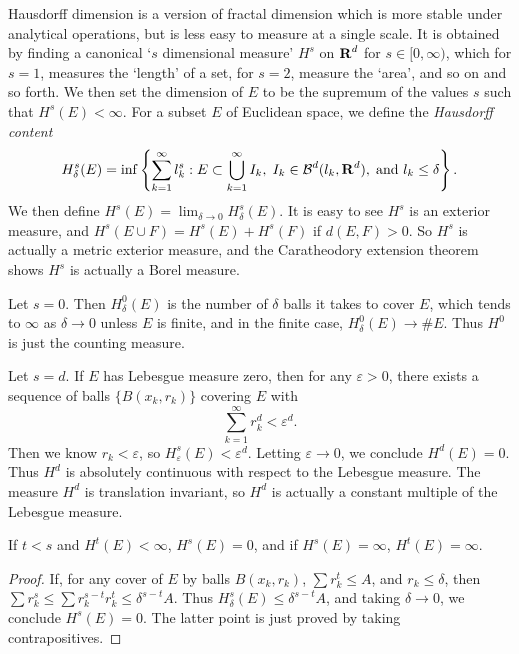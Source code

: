 Hausdorff dimension is a version of fractal dimension which is more stable under analytical operations, but is less easy to measure at a single scale. It is obtained by finding a canonical `$s$ dimensional measure' $H^s$ on $\operatorname{\mathbf{R}}^d$ for $s \in [0,\infty)$, which for $s = 1$, measures the `length' of a set, for $s = 2$, measure the `area', and so on and so forth. We then set the dimension of $E$ to be the supremum of the values $s$ such that $H^s(E) < \infty$. For a subset $E$ of Euclidean space, we define the {\it Hausdorff content}
%
\[ H_\delta^s(E) = \inf \left\{ \sum_{k = 1}^\infty l_k^s : E \subset \bigcup_{k = 1}^\infty I_k,\; I_k \in \operatorname{\mathcal{B}}^d(l_k,\operatorname{\mathbf{R}}^d),\; \text{and}\ l_k \leq \delta \right\}. \]
%
We then define $H^s(E) = \lim_{\delta \to 0} H_\delta^s(E)$. It is easy to see $H^s$ is an exterior measure, and $H^s(E \cup F) = H^s(E) + H^s(F)$ if $d(E,F) > 0$. So $H^s$ is actually a metric exterior measure, and the Caratheodory extension theorem shows $H^s$ is actually a Borel measure.

\begin{example}
	Let $s = 0$. Then $H_\delta^0(E)$ is the number of $\delta$ balls it takes to cover $E$, which tends to $\infty$ as $\delta \to 0$ unless $E$ is finite, and in the finite case, $H_\delta^0(E) \to \# E$. Thus $H^0$ is just the counting measure.
\end{example}

\begin{example}
	Let $s = d$. If $E$ has Lebesgue measure zero, then for any $\varepsilon > 0$, there exists a sequence of balls $\{ B(x_k,r_k) \}$ covering $E$ with
	\[ \sum_{k = 1}^\infty r_k^d < \varepsilon^d. \]
	Then we know $r_k < \varepsilon$, so $H^s_\varepsilon(E) < \varepsilon^d$. Letting $\varepsilon \to 0$, we conclude $H^d(E) = 0$. Thus $H^d$ is absolutely continuous with respect to the Lebesgue measure. The measure $H^d$ is translation invariant, so $H^d$ is actually a constant multiple of the Lebesgue measure.
\end{example}

\begin{lemma}
	If $t < s$ and $H^t(E) < \infty$, $H^s(E) = 0$, and if $H^s(E) = \infty$, $H^t(E) = \infty$.
\end{lemma}
\begin{proof}
	If, for any cover of $E$ by balls $B(x_k,r_k)$, $\sum r_k^t \leq A$, and $r_k \leq \delta$, then $\sum r_k^s \leq \sum r_k^{s-t} r_k^t \leq \delta^{s-t} A$. Thus $H^s_\delta(E) \leq \delta^{s-t} A $, and taking $\delta \to 0$, we conclude $H^s(E) = 0$. The latter point is just proved by taking contrapositives.
\end{proof}

